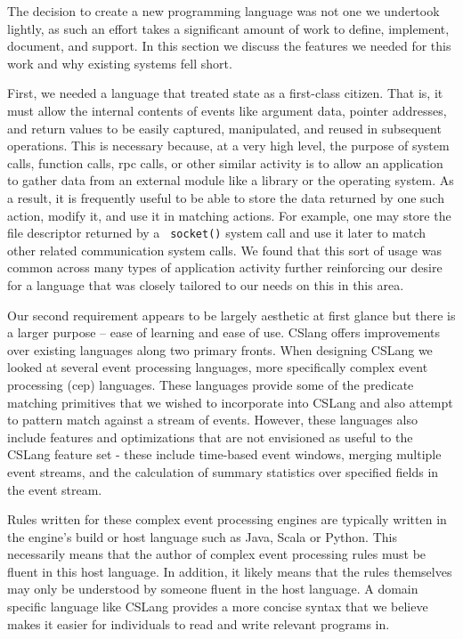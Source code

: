 The decision to create a new programming language was not one we
undertook lightly,
as such an effort takes
a significant amount of work
to define,
implement, document, and support.
In this section we discuss the features we needed for this work
and why existing systems fell short.

First, we needed a language that treated state as a first-class citizen.
That is, it must allow the internal contents of events like argument data,
pointer addresses, and return values to be easily captured, manipulated, and
reused in subsequent operations.
This is necessary because,
at a very high level,
the purpose of system calls,
function calls,
rpc calls,
or other similar activity
is to allow an application
to gather data from an external module like a library or the operating
system.
As a result, it is frequently useful to be able to store the data returned by
one such action, modify it, and use it in matching actions.
For example, one may store the file descriptor returned by a {\tt
socket()} system call and use it later to match other related
communication system calls.
We found that this sort of usage was common across many types of
application activity further reinforcing our desire for a language that was
closely tailored to our needs on this in this area.




Our second requirement appears to be largely aesthetic at first glance
but there is a
larger purpose -- ease of learning and ease of use.  CSlang offers
improvements over existing languages along two primary fronts.
When designing CSLang we looked at several event processing languages, more
specifically complex event processing (cep) languages.  These languages
provide some of the predicate matching primitives that we wished to
incorporate into CSLang and also attempt to pattern match against a stream
of events. However, these languages also include features and optimizations
that are not envisioned as useful to the CSLang feature set - these include
time-based event windows, merging multiple event streams, and the calculation of
summary statistics over specified fields in the event stream.

Rules written for these complex event processing engines are typically
written in the engine's build or host language such as Java, Scala or
Python. This necessarily means that the author of complex event processing
rules must be fluent in this host language.  In addition, it likely means
that the rules themselves may only be understood by someone fluent in the
host language.  A domain specific language like CSLang provides a more
concise syntax that we believe makes it easier for individuals to read and
write relevant programs in.

